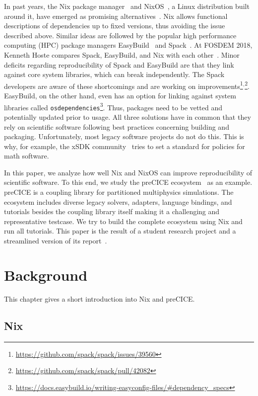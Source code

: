 \documentclass{eceasst}
\begin{document}
In past years, the Nix package manager~\cite{Dolstra_2004} and NixOS~\cite{Dolstra_2010}, a Linux distribution built around it, have emerged as promising alternatives~\cite{Devresse_2015}.
Nix allows functional descriptions of dependencies up to fixed versions, thus avoiding the issue described above.
Similar ideas are followed by the popular high performance computing (HPC) package managers EasyBuild~\cite{easybuil6495863} and Spack~\cite{spack7832814}.
At FOSDEM 2018, Kenneth Hoste compares Spack, EasyBuild, and Nix with each other~\cite{Hoste}.
Minor deficits regarding reproducibility of Spack and EasyBuild are that they link against core system libraries, which can break independently. The Spack developers are aware of these shortcomings and are working on improvements\footnote{\url{https://github.com/spack/spack/issues/39560}}$^,$\footnote{\url{https://github.com/spack/spack/pull/42082}}.
EasyBuild, on the other hand, even has an option for linking against system libraries called \texttt{osdependencies}\footnote{\url{https://docs.easybuild.io/writing-easyconfig-files/\#dependency\_specs}}. Thus, packages need to be vetted and potentially updated prior to usage.
All three solutions have in common that they rely on scientific software following best practices concerning building and packaging.
Unfortunately, most legacy software projects do not do this.
This is why, for example, the xSDK community~\cite{xSDK2023} tries to set a standard for policies for math software.

In this paper, we analyze how well Nix and NixOS can improve reproducibility of scientific software.
To this end, we study the preCICE ecosystem~\cite{preCICEv2} as an example.
preCICE is a coupling library for partitioned multiphysics simulations.
The ecosystem includes diverse legacy solvers, adapters, language bindings, and tutorials besides the coupling library itself making it a challenging and representative testcase.
We try to build the complete ecosystem using Nix and run all tutorials.
This paper is the result of a student research project and a streamlined version of its report~\cite{studentreport}.

\section{Background}

This chapter gives a short introduction into Nix and preCICE.

\subsection{Nix}\label{sec:nix}
\end{document}
